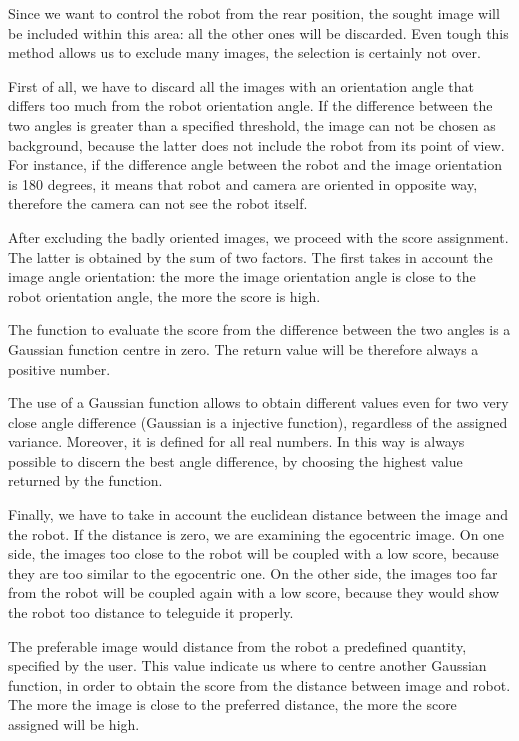 %
Since we want to control the robot from the rear position, the sought image will be included within
this area: all the other ones will be discarded. Even tough this method allows us to exclude many
images, the selection is certainly not over.
%

%
First of all, we have to discard all the images with an orientation angle that differs too much from the
robot orientation angle. If the difference between the two angles is greater than a specified threshold,
the image can not be chosen as background, because the latter does not include the robot from its point
of view. For instance, if the difference angle between the robot and the image orientation is 180 degrees,
it means that robot and camera are oriented in opposite way, therefore the camera can not see the robot
itself.
%

%
After excluding the badly oriented images, we proceed with the score assignment. The latter is obtained by
the sum of two factors. The first takes in account the image angle orientation: the more the image orientation
angle is close to the robot orientation angle, the more the score is high.
%

%
The function to evaluate the score from the difference between the two angles is a Gaussian function centre
in zero. The return value will be therefore always a positive number.
%

%
The use of a Gaussian function allows to obtain different values even for two very close angle difference
(Gaussian is a injective function), regardless of the assigned variance. Moreover, it is defined for all real
numbers.
In this way is always possible to discern the best angle difference, by choosing the highest value returned by
the function.
%

%
Finally, we have to take in account the euclidean distance between the image and the robot. If the distance is
zero, we are examining the egocentric image. On one side, the images too close to the robot will be coupled
with a low score, because they are too similar to the egocentric one. On the other side, the images too far
from the robot will be coupled again with a low score, because they would show the robot too distance to
teleguide it properly.
%

%
The preferable image would distance from the robot a predefined quantity, specified by the user. This value
indicate us where to centre another Gaussian function, in order to obtain the score from the distance between
image and robot. The more the image is close to the preferred distance, the more the score assigned will be high.
%

